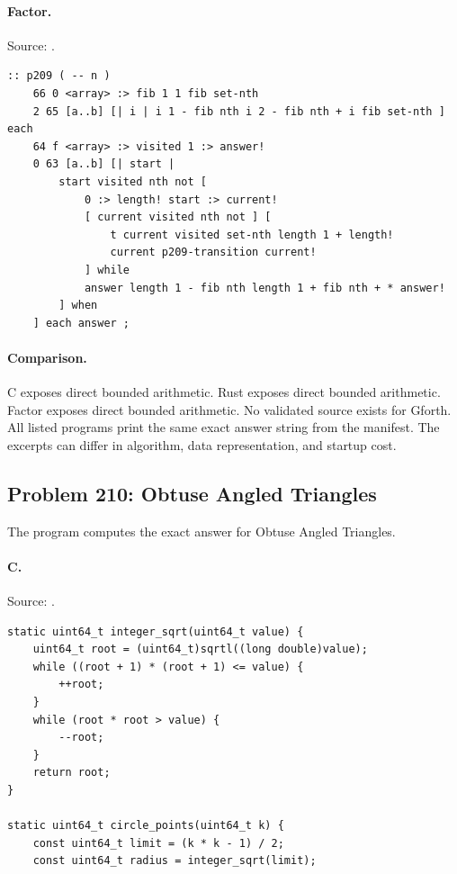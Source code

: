 \paragraph{Factor.} Source: .
\begin{lstlisting}
:: p209 ( -- n )
    66 0 <array> :> fib 1 1 fib set-nth
    2 65 [a..b] [| i | i 1 - fib nth i 2 - fib nth + i fib set-nth ] each
    64 f <array> :> visited 1 :> answer!
    0 63 [a..b] [| start |
        start visited nth not [
            0 :> length! start :> current!
            [ current visited nth not ] [
                t current visited set-nth length 1 + length!
                current p209-transition current!
            ] while
            answer length 1 - fib nth length 1 + fib nth + * answer!
        ] when
    ] each answer ;
\end{lstlisting}

\paragraph{Comparison.}
C exposes direct bounded arithmetic. Rust exposes direct bounded arithmetic. Factor exposes direct bounded arithmetic.
No validated source exists for Gforth.
All listed programs print the same exact answer string from the manifest. The excerpts can differ in algorithm, data representation, and startup cost.

\subsection{Problem 210: Obtuse Angled Triangles}
\label{walkthrough:p210}
The program computes the exact answer for Obtuse Angled Triangles.

\paragraph{C.} Source: .
\begin{lstlisting}
static uint64_t integer_sqrt(uint64_t value) {
    uint64_t root = (uint64_t)sqrtl((long double)value);
    while ((root + 1) * (root + 1) <= value) {
        ++root;
    }
    while (root * root > value) {
        --root;
    }
    return root;
}

static uint64_t circle_points(uint64_t k) {
    const uint64_t limit = (k * k - 1) / 2;
    const uint64_t radius = integer_sqrt(limit);
\end{lstlisting}

